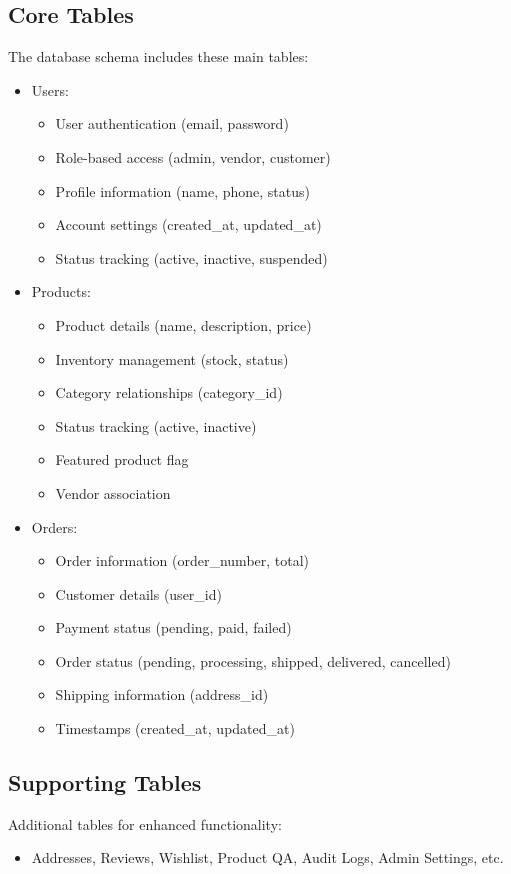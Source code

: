 \subsection{Core Tables}
The database schema includes these main tables:
\begin{itemize}
    \item Users:
    \begin{itemize}
        \item User authentication (email, password)
        \item Role-based access (admin, vendor, customer)
        \item Profile information (name, phone, status)
        \item Account settings (created\_at, updated\_at)
        \item Status tracking (active, inactive, suspended)
    \end{itemize}
    \item Products:
    \begin{itemize}
        \item Product details (name, description, price)
        \item Inventory management (stock, status)
        \item Category relationships (category\_id)
        \item Status tracking (active, inactive)
        \item Featured product flag
        \item Vendor association
    \end{itemize}
    \item Orders:
    \begin{itemize}
        \item Order information (order\_number, total)
        \item Customer details (user\_id)
        \item Payment status (pending, paid, failed)
        \item Order status (pending, processing, shipped, delivered, cancelled)
        \item Shipping information (address\_id)
        \item Timestamps (created\_at, updated\_at)
    \end{itemize}
\end{itemize}

\subsection{Supporting Tables}
Additional tables for enhanced functionality:
\begin{itemize}
    \item Addresses, Reviews, Wishlist, Product QA, Audit Logs, Admin Settings, etc.
\end{itemize}

